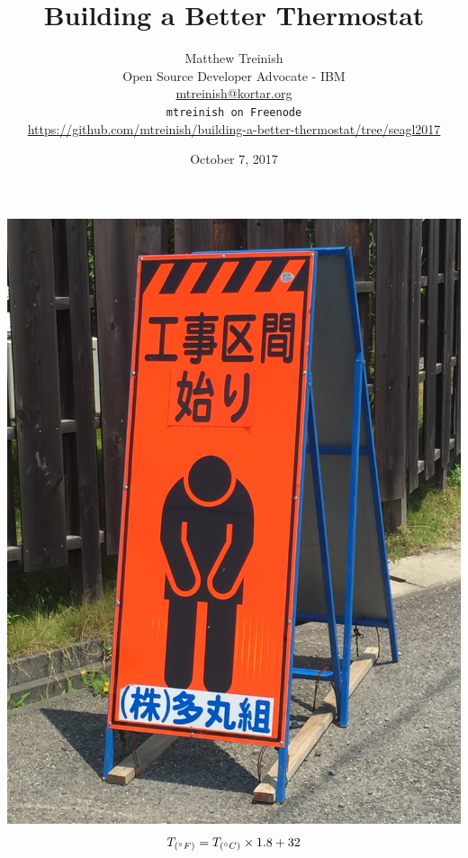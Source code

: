 \documentclass[aspectratio=169,11pt,hyperref={colorlinks=true}]{beamer}
\author[Matthew Treinish]{%
    \texorpdfstring{%
        \centering
        Matthew Treinish\\
        Open Source Developer Advocate - IBM \\
        \href{mailto:mtreinish@kortar.org}{mtreinish@kortar.org}\\
        \texttt{mtreinish on Freenode}\\
        \href{https://github.com/mtreinish/building-a-better-thermostat/tree/seagl2017}{https://github.com/mtreinish/building-a-better-thermostat/tree/seagl2017}
   }
   {Matthew Treinish}
}
\date{October 7, 2017}
\title{Building a Better Thermostat}
\begin{document}
\titlepage

\begin{frame}
    \begin{center}
        \includegraphics[height=.75\textheight]{apology.jpg}
        \huge\textbf{$$T_{(\degree F)} = T_{(\degree C)} \times 1.8 + 32$$}
    \end{center}
\end{frame}
\end{document}
